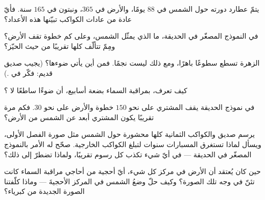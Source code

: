 \begin{exercise}[$\star$]\label{exo:g4:solar-system:5}
يتمّ عطارد دورته حول الشمس في $88$ يومًا، والأرض في $365$،
ونبتون في $165$ سنة. فأيّ عادة من عادات الكواكب تبيّنها هذه
الأعداد؟
\end{exercise}

\begin{exercise}[$\star$]\label{exo:g4:solar-system:6}
في النموذج المصغّر في الحديقة، ما الذي يمثّل الشمس، وعلى كم
خطوة تقف الأرض؟ ومِمّ تتألّف  كلها تقريبًا من
حيث الحيّز؟
\end{exercise}

\begin{exercise}[$\star$]\label{exo:g4:solar-system:7}
الزهرة تسطع سطوعًا باهرًا، ومع ذلك ليست نجمًا. فمن أين يأتي
ضوءها؟ (يجيب صديق قديم: فكّر في .)
\end{exercise}

\begin{exercise}[$\star$]\label{exo:g4:solar-system:8}
كيف تعرف، بمراقبة السماء بضعة أسابيع، أن ضوءًا ساطعًا  لا
؟
\end{exercise}

\begin{exercise}[$\star$]\label{exo:g4:solar-system:9}
في نموذج الحديقة يقف المشتري على نحو $150$ خطوة والأرض على نحو
$30$. فكم مرة تقريبًا يكون المشتري أبعد عن الشمس من الأرض؟
\end{exercise}

\begin{exercise}[$\star\star$]\label{exo:g4:solar-system:10}
يرسم صديق  والكواكب الثمانية كلها محشورة حول
الشمس مثل صورة الفصل الأولى، ويسأل لماذا تستغرق المسبارات سنوات
لتبلغ الكواكب الخارجية. صحّح له الأمر بالنموذج المصغّر في
الحديقة --- في أيّ شيء تكذب كل رسوم  تقريبًا،
ولماذا تضطرّ إلى ذلك؟
\end{exercise}

\begin{exercise}[$\star\star$]\label{exo:g4:solar-system:11}
حين كان يُعتقد أن الأرض في مركز كل شيء، أيّ أحجية من أحاجي
مراقبة السماء كانت تئنّ في وجه تلك الصورة؟ وكيف حلّ وضعُ الشمس
في المركز الأحجيةَ --- وماذا كلّفتنا الصورة الجديدة من كبرياء؟
\end{exercise}
